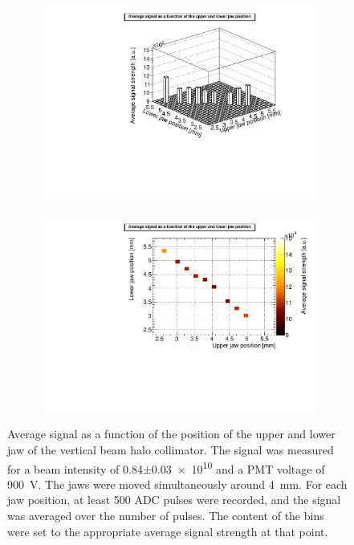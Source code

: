 \begin{figure}
\begin{subfigure}[b]{0.5\textwidth}
\includegraphics[width=\textwidth]{Figures/AsymmetricScan_4mm_beamintensity084_lego.pdf}
\end{subfigure}
\begin{subfigure}[b]{0.5\textwidth}
\includegraphics[width=\textwidth]{Figures/AsymmetricScan_4mm_beamintensity084_colz.pdf}
\end{subfigure}
\caption[RHUL Cherenkov detector signal for certain upper/lower jaw positions around \SI{4}{\milli\metre}, for a beam intensity of \num{0.84}$\pm$\num{0.03e10}]{Average signal as a function of the position of the upper and lower jaw of the vertical beam halo collimator. The signal was measured for a beam intensity of \num{0.84}$\pm$\num{0.03e10} and a PMT voltage of \SI{900}{\volt}. The jaws were moved simultaneously around \SI{4}{\milli\metre}. For each jaw position, at least 500 ADC pulses were recorded, and the signal was averaged over the number of pulses. The content of the bins were set to the appropriate average signal strength at that point.}
\label{fig:AverageSignal_Asymmetric_4mm_084}
\end{figure}
